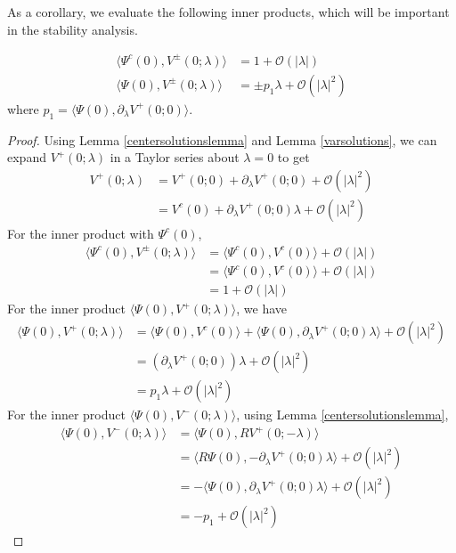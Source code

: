 \documentclass[thesis.tex]{subfiles}
\begin{document}
As a corollary, we evaluate the following inner products, which will be important in the stability analysis.

\begin{corollary}\label{lemma:VpmPsiIP}
\begin{equation}\label{VpmIPs}
\begin{aligned}
\langle \Psi^c(0), V^\pm(0; \lambda) \rangle &= 1 + \mathcal{O}(|\lambda|) \\
\langle \Psi(0), V^\pm(0; \lambda) \rangle &= \pm p_1 \lambda + \mathcal{O}(|\lambda|^2)
\end{aligned}
\end{equation}
where $p_1 = \langle \Psi(0), \partial_\lambda V^+(0; 0) \rangle$.
\begin{proof}
Using Lemma \ref{centersolutionslemma} and Lemma \ref{varsolutions}, we can expand $V^+(0; \lambda)$ in a Taylor series about $\lambda = 0$ to get
\begin{align*}
V^+(0; \lambda) &= V^+(0; 0) + \partial_\lambda V^+(0; 0) + \mathcal{O}(|\lambda|^2) \\
&= V^c(0) + \partial_\lambda V^+(0; 0) \lambda + \mathcal{O}(|\lambda|^2) 
\end{align*}
For the inner product with $\Psi^c(0)$,
\begin{align*}
\langle \Psi^c(0), V^\pm(0; \lambda) \rangle &= 
\langle \Psi^c(0), V^c(0) \rangle + \mathcal{O}(|\lambda|) \\
&= \langle \Psi^c(0), V^c(0) \rangle + \mathcal{O}(|\lambda|) \\
&= 1 + \mathcal{O}(|\lambda|)
\end{align*}
For the inner product $\langle \Psi(0), V^+(0; \lambda) \rangle$, we have
\begin{align*}
\langle \Psi(0), V^+(0; \lambda) \rangle 
&= \langle \Psi(0), V^c(0) \rangle + \langle \Psi(0), \partial_\lambda V^+(0; 0) \lambda \rangle + \mathcal{O}(|\lambda|^2) \\
&= (\partial_\lambda V^+(0; 0)) \lambda + \mathcal{O}(|\lambda|^2) \\
&= p_1 \lambda + \mathcal{O}(|\lambda|^2)
\end{align*}
For the inner product $\langle \Psi(0), V^-(0; \lambda) \rangle$, using Lemma \ref{centersolutionslemma},
\begin{align*}
\langle \Psi(0), V^-(0; \lambda) \rangle &= 
\langle \Psi(0), R V^+(0; -\lambda) \rangle \\
&= \langle R \Psi(0), -\partial_\lambda V^+(0; 0) \lambda \rangle + \mathcal{O}(|\lambda|^2) \\
&= -\langle \Psi(0), \partial_\lambda V^+(0; 0) \lambda \rangle + \mathcal{O}(|\lambda|^2) \\
&= -p_1 + \mathcal{O}(|\lambda|^2)
\end{align*}
\end{proof}
\end{corollary}
\end{document}
